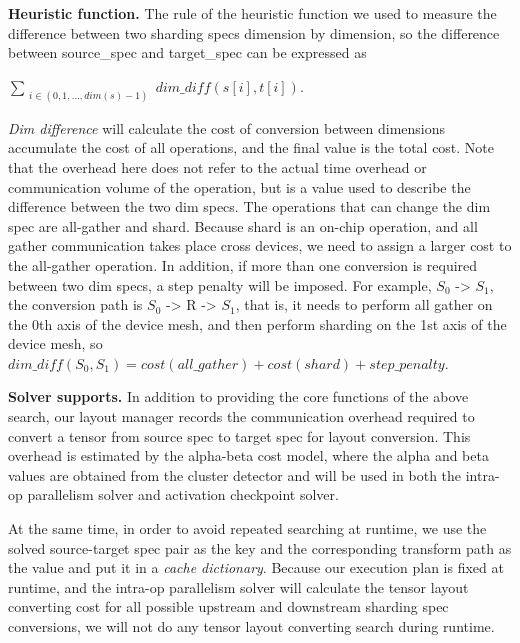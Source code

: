 \noindent\textbf{Heuristic function.} The rule of the heuristic function we used to measure the difference between two sharding specs dimension by dimension, so the difference between source\_spec and target\_spec can be expressed as\\ 
\begin{center}
$\sum_{\substack{i \in (0, 1, \dotsc,dim(s)-1)}} dim\_diff(s[i], t[i])$.
\end{center}


\textit{Dim difference} will calculate the cost of conversion between dimensions accumulate the cost of all operations, and the final value is the total cost. Note that the overhead here does not refer to the actual time overhead or communication volume of the operation, but is a value used to describe the difference between the two dim specs. The operations that can change the dim spec are all-gather and shard. Because shard is an on-chip operation, and all gather communication takes place cross devices, we need to assign a larger cost to the all-gather operation. In addition, if more than one conversion is required between two dim specs, a step penalty will be imposed. For example, $S_0$ -> $S_1$, the conversion path is $S_0$ -> R -> $S_1$, that is, it needs to perform all gather on the 0th axis of the device mesh, and then perform sharding on the 1st axis of the device mesh, so $dim\_diff(S_0, S_1) = cost(all\_gather) + cost(shard) + step\_penalty.$


\noindent\textbf{Solver supports.} In addition to providing the core functions of the above search, our layout manager records the communication overhead required to convert a tensor from source spec to target spec for layout conversion. This overhead is estimated by the alpha-beta cost model, where the alpha and beta values are obtained from the cluster detector and will be used in both the intra-op parallelism solver and activation checkpoint solver.\par

At the same time, in order to avoid repeated searching at runtime, we use the solved source-target spec pair as the key and the corresponding transform path as the value and put it in a \textit{cache dictionary}. Because our execution plan is fixed at runtime, and the intra-op parallelism solver will calculate the tensor layout converting cost for all possible upstream and downstream sharding spec conversions, we will not do any tensor layout converting search during runtime.